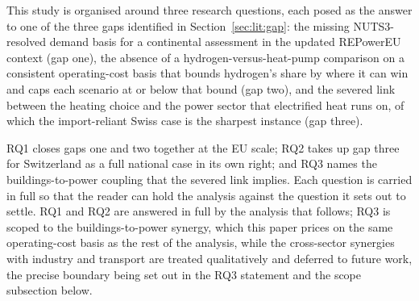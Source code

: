 
\label{sec:rq}


This study is organised around three research questions, each posed as the answer to one
of the three gaps identified in Section~\ref{sec:lit:gap}: the missing NUTS3-resolved
demand basis for a continental assessment in the updated REPowerEU context (gap one),
the absence of a hydrogen-versus-heat-pump comparison on a consistent operating-cost
basis that bounds hydrogen's share by where it can win and caps each scenario at or
below that bound (gap two),
and the severed link between the heating choice and the power sector that electrified
heat runs on, of which the import-reliant Swiss case is the sharpest instance (gap
three).

RQ1 closes gaps one and two together at the EU scale; RQ2 takes up gap three for
Switzerland as a full national case in its own right; and RQ3 names the
buildings-to-power coupling that the severed link implies. Each question is carried in
full so that the reader can hold the analysis against the question it sets out to
settle. RQ1 and RQ2 are answered in full by the analysis that follows; RQ3 is scoped to
the buildings-to-power synergy, which this paper prices on the same operating-cost basis
as the rest of the analysis, while the cross-sector synergies with industry and
transport are treated qualitatively and deferred to future work, the precise boundary
being set out in the RQ3 statement and the scope subsection below.

